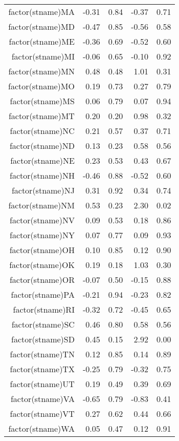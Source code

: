 \begin{table}[ht]
\begin{tabular}{rrrrr}
  factor(stname)MA & -0.31 & 0.84 & -0.37 & 0.71 \\ 
  factor(stname)MD & -0.47 & 0.85 & -0.56 & 0.58 \\ 
  factor(stname)ME & -0.36 & 0.69 & -0.52 & 0.60 \\ 
  factor(stname)MI & -0.06 & 0.65 & -0.10 & 0.92 \\ 
  factor(stname)MN & 0.48 & 0.48 & 1.01 & 0.31 \\ 
  factor(stname)MO & 0.19 & 0.73 & 0.27 & 0.79 \\ 
  factor(stname)MS & 0.06 & 0.79 & 0.07 & 0.94 \\ 
  factor(stname)MT & 0.20 & 0.20 & 0.98 & 0.32 \\ 
  factor(stname)NC & 0.21 & 0.57 & 0.37 & 0.71 \\ 
  factor(stname)ND & 0.13 & 0.23 & 0.58 & 0.56 \\ 
  factor(stname)NE & 0.23 & 0.53 & 0.43 & 0.67 \\ 
  factor(stname)NH & -0.46 & 0.88 & -0.52 & 0.60 \\ 
  factor(stname)NJ & 0.31 & 0.92 & 0.34 & 0.74 \\ 
  factor(stname)NM & 0.53 & 0.23 & 2.30 & 0.02 \\ 
  factor(stname)NV & 0.09 & 0.53 & 0.18 & 0.86 \\ 
  factor(stname)NY & 0.07 & 0.77 & 0.09 & 0.93 \\ 
  factor(stname)OH & 0.10 & 0.85 & 0.12 & 0.90 \\ 
  factor(stname)OK & 0.19 & 0.18 & 1.03 & 0.30 \\ 
  factor(stname)OR & -0.07 & 0.50 & -0.15 & 0.88 \\ 
  factor(stname)PA & -0.21 & 0.94 & -0.23 & 0.82 \\ 
  factor(stname)RI & -0.32 & 0.72 & -0.45 & 0.65 \\ 
  factor(stname)SC & 0.46 & 0.80 & 0.58 & 0.56 \\ 
  factor(stname)SD & 0.45 & 0.15 & 2.92 & 0.00 \\ 
  factor(stname)TN & 0.12 & 0.85 & 0.14 & 0.89 \\ 
  factor(stname)TX & -0.25 & 0.79 & -0.32 & 0.75 \\ 
  factor(stname)UT & 0.19 & 0.49 & 0.39 & 0.69 \\ 
  factor(stname)VA & -0.65 & 0.79 & -0.83 & 0.41 \\ 
  factor(stname)VT & 0.27 & 0.62 & 0.44 & 0.66 \\ 
  factor(stname)WA & 0.05 & 0.47 & 0.12 & 0.91 \\ 

\end{tabular}
\end{table}
